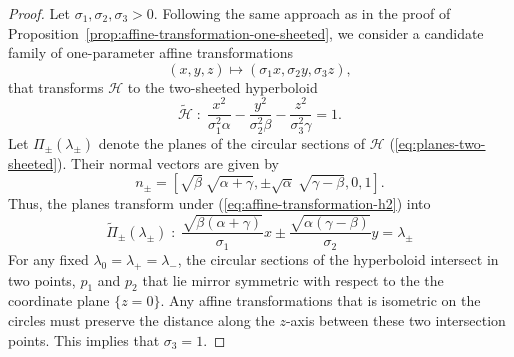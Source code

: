 \documentclass[10pt, a4paper]{article}
\theoremstyle{BoldTopSpacing}
\theoremstyle{BoldTopSpacing}
\theoremstyle{BoldTopSpacing}
\theoremstyle{BoldTopBottomSpacing}
\theoremstyle{BoldTopSpacing}
\theoremstyle{BoldTopBottomSpacing}
\theoremstyle{remark}
\begin{document}
\begin{proof}
Let $\sigma_{1}, \sigma_{2}, \sigma_{3} > 0$. Following the same approach as in the proof of Proposition~\ref{prop:affine-transformation-one-sheeted}, we consider a candidate family of one-parameter affine transformations
\begin{equation*}
\label{eq:affine-transformation-h2}
    (x, y, z) \mapsto (\sigma_{1}x, \sigma_{2}y, \sigma_{3}z),
\end{equation*}
that transforms $\mathcal{H}$ to the two-sheeted hyperboloid
\[
\tilde{\mathcal{H}} \; : \; \frac{x^2}{\sigma_{1}^2\alpha} - \frac{y^2}{\sigma_{2}^2\beta} - \frac{z^2}{\sigma_{3}^2\gamma} = 1.
\]
Let $\Pi_{\pm}(\lambda_{\pm})$ denote the planes of the circular sections of $\mathcal{H}$ (\ref{eq:planes-two-sheeted}). Their normal vectors are given by
\[
    n_{\pm} = \left[\sqrt{\beta} \ \sqrt{\alpha + \gamma}, \pm \sqrt{\alpha} \ \sqrt{\gamma - \beta}, 0, 1 \right].
\]
Thus, the planes transform under (\ref{eq:affine-transformation-h2}) into
\begin{equation}
\label{eq:transformed-plane-h2}
\tilde{\Pi}_{\pm}(\lambda_{\pm}) \; : \; \frac{\sqrt{\beta (\alpha + \gamma)}}{\sigma_{1}} x \pm \frac{\sqrt{\alpha (\gamma - \beta)}}{\sigma_{2}} y = \lambda_{\pm}
\end{equation}
For any fixed $\lambda_{0} = \lambda_{+} = \lambda_{-}$, the circular sections of the hyperboloid intersect in two points, $p_1$ and $p_2$ that lie mirror symmetric with respect to the the coordinate plane $\{z = 0\}$. Any affine transformations that is isometric on the circles must preserve the distance along the $z$-axis between these two intersection points. This implies that $\sigma_{3} = 1$. \par


\end{proof}
\end{document}
